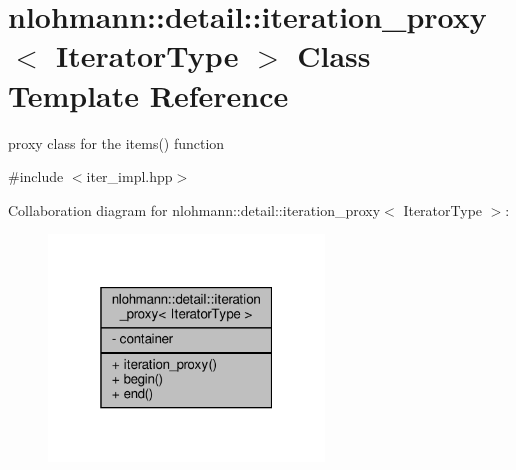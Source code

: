 \hypertarget{classnlohmann_1_1detail_1_1iteration__proxy}{}\section{nlohmann\+:\+:detail\+:\+:iteration\+\_\+proxy$<$ Iterator\+Type $>$ Class Template Reference}
\label{classnlohmann_1_1detail_1_1iteration__proxy}


proxy class for the items() function  




{\ttfamily \#include $<$iter\+\_\+impl.\+hpp$>$}



Collaboration diagram for nlohmann\+:\+:detail\+:\+:iteration\+\_\+proxy$<$ Iterator\+Type $>$\+:\nopagebreak
\begin{figure}[H]
\begin{center}
\leavevmode
\includegraphics[width=208pt]{classnlohmann_1_1detail_1_1iteration__proxy__coll__graph}
\end{center}
\end{figure}

